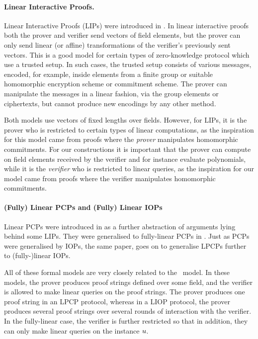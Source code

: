 \paragraph{Linear Interactive Proofs.} Linear Interactive Proofs  (LIPs) were introduced in \cite{BitanskyCIPO13}. In linear interactive proofs both the prover and verifier send vectors of field elements, but the prover can only send linear (or affine) transformations of the verifier's previously sent vectors. This is a good model for certain types of zero-knowledge protocol which use a trusted setup. In such cases, the trusted setup consists of various messages, encoded, for example, inside elements from a finite group or suitable homomorphic encryption scheme or commitment scheme. The prover can manipulate the messages in a linear fashion, via the group elements or ciphertexts, but cannot produce new encodings by any other method. 

Both models use vectors of fixed lengths over fields. However, for LIPs, it is the prover who is restricted to certain types of linear computations, as the inspiration for this model came from proofs where the \emph{prover} manipulates homomorphic commitments. For our constructions it is important that the prover can compute on field elements received by the verifier and for instance evaluate polynomials, while it is the \emph{verifier} who is restricted to linear queries, as the inspiration for our model came from proofs where the verifier manipulates homomorphic commitments.

\paragraph{(Fully) Linear PCPs and (Fully) Linear IOPs}

Linear PCPs were introduced in \cite{BitanskyCIPO13} as a further abstraction of arguments lying behind some LIPs. They were generalised to fully-linear PCPs in . Just as PCPs were generalised by IOPs, the same paper,  goes on to generalise LPCPs further to (fully-)linear IOPs.

All of these formal models are very closely related to the \ILC\ model. In these models, the prover produces proof strings defined over some field, and the verifier is allowed to make linear queries on the proof strings. The prover produces one proof string in an LPCP protocol, whereas in a LIOP protocol, the prover produces several proof strings over several rounds of interaction with the verifier. In the fully-linear case, the verifier is further restricted so that in addition, they can only make linear queries on the instance $u$.

